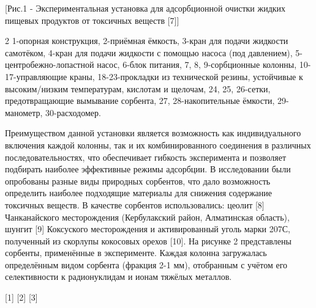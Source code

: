 [Рис.1 - Экспериментальная установка для адсорбционной очистки
жидких пищевых продуктов от токсичных веществ {[}7{]}]

\begin{multicols}{2}
1-опорная конструкция, 2-приёмная ёмкость, 3-кран для подачи жидкости
самотёком, 4-кран для подачи жидкости с помощью насоса (под давлением),
5-центробежно-лопастной насос, 6-блок питания, 7, 8, 9-сорбционные
колонны, 10-17-управляющие краны, 18-23-прокладки из технической резины,
устойчивые к высоким/низким температурам, кислотам и щелочам, 24, 25,
26-сетки, предотвращающие вымывание сорбента, 27, 28-накопительные
ёмкости, 29-манометр, 30-расходомер.

Преимуществом данной установки является возможность как индивидуального
включения каждой колонны, так и их комбинированного соединения в
различных последовательностях, что обеспечивает гибкость эксперимента и
позволяет подбирать наиболее эффективные режимы адсорбции. В
исследовании были опробованы разные виды природных сорбентов, что дало
возможность определить наиболее подходящие материалы для снижения
содержание токсичных веществ. В качестве сорбентов использовались:
цеолит {[}8{]} Чанканайского месторождения (Кербулакский район,
Алматинская область), шунгит {[}9{]} Коксуского месторождения и
активированный уголь марки 207С, полученный из скорлупы кокосовых орехов
{[}10{]}. На рисунке 2 представлены сорбенты, применённые в
эксперименте. Каждая колонна загружалась определённым видом сорбента
(фракция 2-1 мм), отобранным с учётом его селективности к радионуклидам
и ионам тяжёлых металлов.
\end{multicols}

\begin{figs}
    [1]
    [2]
    [3]
\end{figs}

